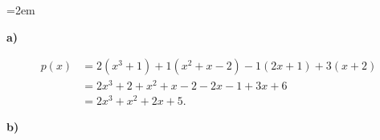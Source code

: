 \begin{solution}    

    \vspace{1\baselineskip}

    \leftskip=2em

    \textbf{a)}

    \begin{equation*}
        \begin{aligned}
            p(x) &= 2(x^3+1) + 1(x^2+x-2) - 1(2x+1) + 3(x+2) \\
            &= 2x^3 + 2 + x^2 + x - 2 - 2x - 1 + 3x + 6 \\            
            &= 2x^3 + x^2 + 2x + 5.
        \end{aligned}
    \end{equation*}

    \textbf{b)}


\end{solution}
